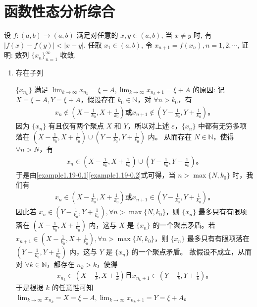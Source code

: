 \documentclass[../../main.tex]{subfiles}
\begin{document}
\section{函数性态分析综合}

\begin{example}
设 $f : (a, b) \to (a, b)$ 满足对任意的 $x, y \in (a, b)$, 当 $x \neq y$ 时, 有 $\left| f(x) - f(y) \right| < \left| x - y \right|$. 任取 $x_1 \in (a, b)$, 令 $x_{n+1} = f(x_n), n = 1, 2, \cdots$, 证明: 数列 $\{x_n\}_{n=1}^{\infty}$ 收敛.
\end{example}
\begin{remark}
\begin{enumerate}[(1)]
\item \hypertarget{找相邻子列满足条件的方法证明}{存在子列} $\{x_{n_k}\}$ 满足 $\lim_{k \to \infty} x_{n_k} = \xi - A, \lim_{k \to \infty} x_{n_k+1} = \xi + A$ 的原因:
记 $X = \xi - A, Y = \xi + A$，假设存在 $k_0 \in \mathbb{N}$，对 $\forall n > k_0$，有
\begin{align}
x_n \notin (X - \frac{1}{k_0}, X + \frac{1}{k_0}) \text{或} x_{n+1} \notin (Y - \frac{1}{k_0}, Y + \frac{1}{k_0})。 \label{example1.19-0.1}
\end{align}
因为 $\{x_n\}$ 有且仅有两个聚点 $X$ 和 $Y$，所以对上述 $\varepsilon$，$\{x_n\}$ 中都有无穷多项落在 $(X - \frac{1}{k_0}, X + \frac{1}{k_0}) \cup (Y - \frac{1}{k_0}, Y + \frac{1}{k_0})$ 内。
从而存在 $N \in \mathbb{N}$，使得 $\forall n > N$，有
\begin{align}
x_n \in (X - \frac{1}{k_0}, X + \frac{1}{k_0}) \cup (Y - \frac{1}{k_0}, Y + \frac{1}{k_0})。 \label{example1.19-0.2}
\end{align}
于是由\eqref{example1.19-0.1}\eqref{example1.19-0.2}式可得，当 $n > \max\{N, k_0\}$ 时，我们有
\begin{align*}
x_n \in (X - \frac{1}{k_0}, X + \frac{1}{k_0}) \text{或} x_{n+1} \in (Y - \frac{1}{k_0}, Y + \frac{1}{k_0})。
\end{align*}
因此若 $x_n \in (Y - \frac{1}{k_0}, Y + \frac{1}{k_0}), \forall n > \max\{N, k_0\}$，则 $\{x_n\}$ 最多只有有限项落在 $(X - \frac{1}{k_0}, X + \frac{1}{k_0})$ 内，这与 $X$ 是 $\{x_n\}$ 的一个聚点矛盾。若 $x_{n+1} \in (X - \frac{1}{k_0}, X + \frac{1}{k_0}), \forall n > \max\{N, k_0\}$，则 $\{x_n\}$ 最多只有有限项落在 $(Y - \frac{1}{k_0}, Y + \frac{1}{k_0})$ 内，这与 $Y$ 是 $\{x_n\}$ 的一个聚点矛盾。
故假设不成立，从而对 $\forall k \in \mathbb{N}$，都存在 $n_k > k$，使得
\begin{align*}
x_{n_k} \in (X - \frac{1}{k}, X + \frac{1}{k}) \text{且} x_{n_k+1} \in (Y - \frac{1}{k}, Y + \frac{1}{k})。
\end{align*}
于是根据 $k$ 的任意性可知 $\lim_{k \to \infty} x_{n_k} = X = \xi - A, \lim_{k \to \infty} x_{n_k+1} = Y = \xi + A$。


\end{enumerate}
\end{remark}
\end{document}
